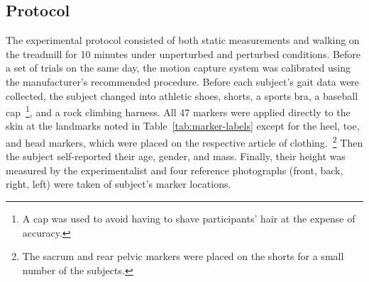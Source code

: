 \documentclass[fleqn,12pt]{wlpeerj}
\begin{document}
\subsection*{Protocol}
%
The experimental protocol consisted of both static measurements and walking on
the treadmill for 10 minutes under unperturbed and perturbed conditions. Before
a set of trials on the same day, the motion capture system was calibrated using
the manufacturer's recommended procedure. Before each subject's gait data were
collected, the subject changed into athletic shoes, shorts, a sports bra, a
baseball cap~\footnote{A cap was used to avoid having to shave participants'
hair at the expense of accuracy.}, and a rock climbing harness. All 47 markers
were applied directly to the skin at the landmarks noted in
Table~\ref{tab:marker-labels} except for the heel, toe, and head markers, which
were placed on the respective article of clothing.~\footnote{The sacrum and
rear pelvic markers were placed on the shorts for a small number of the
subjects.} Then the subject self-reported their age, gender, and mass.
Finally, their height was measured by the experimentalist and four reference
photographs (front, back, right, left) were taken of subject's marker
locations.
%
\end{document}
